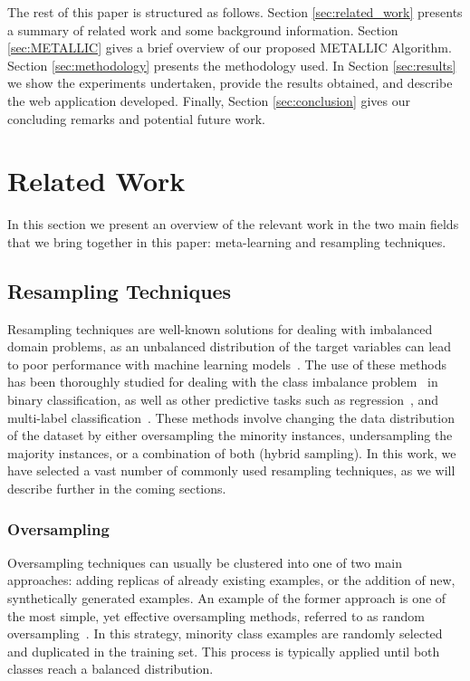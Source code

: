 \documentclass{article}
\begin{document}
The rest of this paper is structured as follows. Section \autoref{sec:related_work} presents a summary of related work and some background information. Section \autoref{sec:METALLIC} gives a brief overview of our proposed METALLIC Algorithm. Section \autoref{sec:methodology} presents the methodology used. In Section \autoref{sec:results} we show the experiments undertaken, provide the results obtained, and describe the web application developed. Finally, Section \autoref{sec:conclusion} gives our concluding remarks and potential future work.

\section{Related Work}\label{sec:related_work}
In this section we present an overview of the relevant work in the two main fields that we bring together in this paper: meta-learning and resampling techniques.

\subsection{Resampling Techniques}
Resampling techniques are well-known solutions for dealing with imbalanced domain problems, as an unbalanced distribution of the target variables can lead to poor performance with machine learning models~\cite{kaurSystematicReviewImbalanced2019}. The use of these methods has been thoroughly studied for dealing with the class imbalance problem~\cite{brancoSurveyPredictiveModeling2016} in binary classification, as well as other predictive tasks such as regression~\cite{brancoPreprocessingApproachesImbalanced2019}, and multi-label classification~\cite{zhangClassImbalanceAwareMultiLabel2022}. These methods involve changing the data distribution of the dataset by either oversampling the minority instances, undersampling the majority instances, or a combination of both (hybrid sampling). In this work, we have selected
a vast number of commonly used resampling techniques, as we will describe further in the coming sections.

\subsubsection{Oversampling}
Oversampling techniques can usually be clustered into one of two main approaches: adding replicas of already existing examples, or the addition of new, synthetically generated examples. An example of the former approach is one of the most simple, yet effective oversampling methods, referred to as random oversampling~\cite{kubatAddressingCurseImbalanced2000}. In this strategy, minority class examples are randomly selected and duplicated in the training set. This process is typically applied until both classes reach a balanced distribution. 
\end{document}
